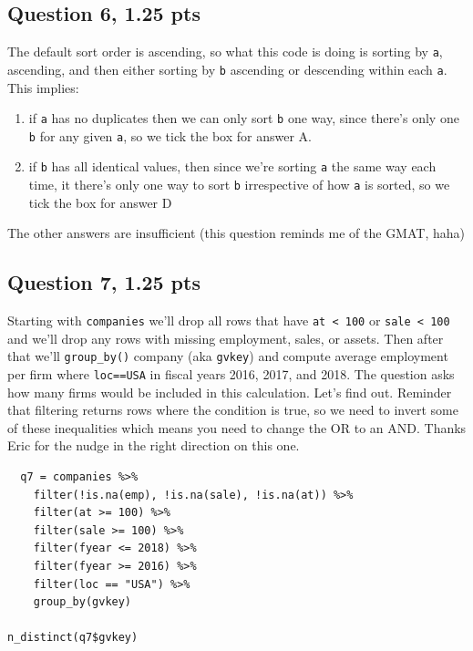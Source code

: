 \documentclass[11pt]{article}
\begin{document}
\subsection*{Question 6, 1.25 pts}
\label{sec:orga455a76}
The default sort order is ascending, so what this code is doing is sorting by \texttt{a}, ascending, and then either sorting by \texttt{b} ascending or descending within each \texttt{a}.  This implies:

\begin{enumerate}
\item if \texttt{a} has no duplicates then we can only sort \texttt{b} one way, since there's only one \texttt{b} for any given \texttt{a}, so we tick the box for answer A.
\item if \texttt{b} has all identical values, then since we're sorting \texttt{a} the same way each time, it there's only one way to sort \texttt{b} irrespective of how \texttt{a} is sorted, so we tick the box for answer D
\end{enumerate}


The other answers are insufficient (this question reminds me of the GMAT, haha)

\newpage
\subsection*{Question 7, 1.25 pts}
\label{sec:org77abbf3}
Starting with \texttt{companies} we'll drop all rows that have \texttt{at < 100} or \texttt{sale < 100} and we'll drop any rows with missing employment, sales, or assets.  Then after that we'll \texttt{group\_by()} company (aka \texttt{gvkey}) and compute average employment per firm where \texttt{loc==USA} in fiscal years 2016, 2017, and 2018.  The question asks how many firms would be included in this calculation.  Let's find out.  Reminder that filtering returns rows where the condition is true, so we need to invert some of these inequalities which means you need to change the OR to an AND.  Thanks Eric for the nudge in the right direction on this one.

\begin{verbatim}
  q7 = companies %>%
    filter(!is.na(emp), !is.na(sale), !is.na(at)) %>%
    filter(at >= 100) %>%
    filter(sale >= 100) %>%
    filter(fyear <= 2018) %>%
    filter(fyear >= 2016) %>%
    filter(loc == "USA") %>%
    group_by(gvkey)

n_distinct(q7$gvkey)
\end{verbatim}
\end{document}
